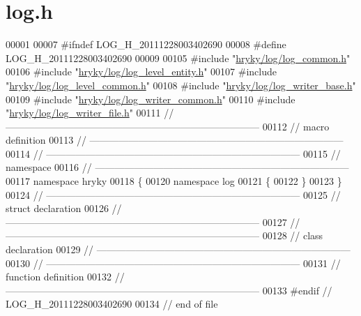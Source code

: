 \hypertarget{log_8h_source}{\section{log.\-h}
}

\begin{DoxyCode}
00001 
00007 \textcolor{preprocessor}{#ifndef LOG\_H\_20111228003402690}
00008 \textcolor{preprocessor}{}\textcolor{preprocessor}{#define LOG\_H\_20111228003402690}
00009 \textcolor{preprocessor}{}
00105 \textcolor{preprocessor}{#include "\hyperlink{log__common_8h}{hryky/log/log_common.h}"}
00106 \textcolor{preprocessor}{#include "\hyperlink{log__level__entity_8h}{hryky/log/log_level_entity.h}"}
00107 \textcolor{preprocessor}{#include "\hyperlink{log__level__common_8h}{hryky/log/log_level_common.h}"}
00108 \textcolor{preprocessor}{#include "\hyperlink{log__writer__base_8h}{hryky/log/log_writer_base.h}"}
00109 \textcolor{preprocessor}{#include "\hyperlink{log__writer__common_8h}{hryky/log/log_writer_common.h}"}
00110 \textcolor{preprocessor}{#include "\hyperlink{log__writer__file_8h}{hryky/log/log_writer_file.h}"}
00111 \textcolor{comment}{//
      ------------------------------------------------------------------------------}
00112 \textcolor{comment}{// macro definition}
00113 \textcolor{comment}{//
      ------------------------------------------------------------------------------}
00114 \textcolor{comment}{//
      ------------------------------------------------------------------------------}
00115 \textcolor{comment}{// namespace}
00116 \textcolor{comment}{//
      ------------------------------------------------------------------------------}
00117 \textcolor{keyword}{namespace }hryky
00118 \{
00120 \textcolor{keyword}{namespace }log
00121 \{
00122 \}
00123 \}
00124 \textcolor{comment}{//
      ------------------------------------------------------------------------------}
00125 \textcolor{comment}{// struct declaration}
00126 \textcolor{comment}{//
      ------------------------------------------------------------------------------}
00127 \textcolor{comment}{//
      ------------------------------------------------------------------------------}
00128 \textcolor{comment}{// class declaration}
00129 \textcolor{comment}{//
      ------------------------------------------------------------------------------}
00130 \textcolor{comment}{//
      ------------------------------------------------------------------------------}
00131 \textcolor{comment}{// function definition}
00132 \textcolor{comment}{//
      ------------------------------------------------------------------------------}
00133 \textcolor{preprocessor}{#endif // LOG\_H\_20111228003402690}
00134 \textcolor{preprocessor}{}\textcolor{comment}{// end of file}
\end{DoxyCode}
